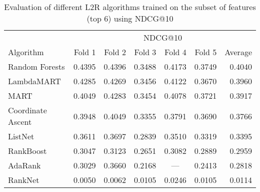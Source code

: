 \begin{table*}[p]
\caption{Evaluation of different L2R algorithms trained on the subset of features (top 6) using NDCG@10 }
\centering
\label{tab:eval_ndcg@10_feature}
\begin{tabular}{lrrrrrr}
\toprule
& \multicolumn{6}{c}{NDCG@10} \\
\cmidrule{2-7}
Algorithm & Fold 1 & Fold 2 & Fold 3 & Fold 4 & Fold 5 & Average \\
\midrule
Random Forests & 0.4395 & 0.4396 & 0.3488 & 0.4173 & 0.3749 & 0.4040 \\
LambdaMART & 0.4285 & 0.4269 & 0.3456 & 0.4122 & 0.3670 & 0.3960 \\
MART & 0.4049 & 0.4283 & 0.3454 & 0.4078 & 0.3721 & 0.3917 \\
Coordinate Ascent & 0.3948 & 0.4049 & 0.3355 & 0.3791 & 0.3690 & 0.3766 \\
ListNet & 0.3611 & 0.3697 & 0.2839 & 0.3510 & 0.3319 & 0.3395 \\
RankBoost & 0.3047 & 0.3123 & 0.2651 & 0.3082 & 0.2889 & 0.2959 \\
AdaRank & 0.3029 & 0.3660 & 0.2168 & \multicolumn{1}{c}{---} & 0.2413 & 0.2818 \\
RankNet & 0.0050 & 0.0062 & 0.0105 & 0.0246 & 0.0105 & 0.0114 \\
\bottomrule
\end{tabular}
\end{table*}

%
%
%


